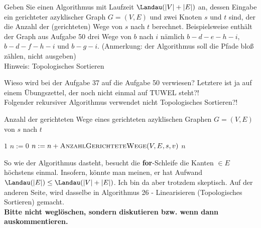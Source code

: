 
\begin{exercise}

Geben Sie einen Algorithmus mit Laufzeit $\Landau(|V| + |E|)$ an, dessen Eingabe ein gerichteter azyklischer Graph $G = (V, E)$ und zwei Knoten $s$ und $t$ sind, der die Anzahl der (gerichteten) Wege von $s$ nach $t$ berechnet.
Beispielsweise enthält der Graph aus Aufgabe 50 drei Wege von $b$ nach $i$ nämlich $b - d - e - h - i$, $b - d - f - h - i$ und $b - g - i$.
(Anmerkung: der Algorithmus soll die Pfade bloß zählen, nicht ausgeben) \\

Hinweis:
Topologisches Sortieren

\end{exercise}


\begin{solution}

\phantom{}


\Quote
{
    Wieso wird bei der Aufgabe 37 auf die Aufgabe 50 verwiesen?
    Letztere ist ja auf einem Übungszettel, der noch nicht einmal auf TUWEL steht?!
} \\

Folgender rekursiver Algorithmus verwendet nicht Topologisches Sortieren?!

\begin{algorithm}
    \caption{Anzahl der gerichteten Wege eines gerichteten azyklischen Graphen $G = (V, E)$ von $s$ nach $t$}
    \begin{algorithmic}[1]
                \State \Return $1$
            \Else
                \State $n := 0$
                    \State $n := n + \textsc{AnzahlGerichteteWege}(V, E, s, v)$
                \EndFor
                \State \Return $n$
            \EndIf
        \EndProcedure
    \end{algorithmic}
\end{algorithm}

So wie der Algorithmus dasteht, besucht die \textbf{for}-Schleife die Kanten $\in E$ höchstens einmal.
Insofern, könnte man meinen, er hat Aufwand $\Landau(|E|) \leq \Landau(|V| + |E|)$.
Ich bin da aber trotzdem skeptisch.
Auf der anderen Seite, wird dasselbe in Algorithmus 26 - Linearisieren (Topologisches Sortieren) gemacht. \\

\textbf{Bitte nicht weglöschen, sondern diskutieren bzw. wenn dann auskommentieren.}

\end{solution}

